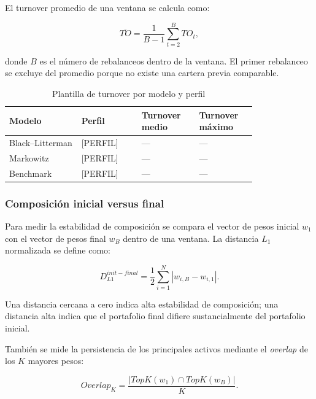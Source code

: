 \documentclass[11pt]{article}
\begin{document}
El turnover promedio de una ventana se calcula como:

\begin{equation}
    \overline{TO}
    =
    \frac{1}{B-1}
    \sum_{t=2}^{B}
    TO_t,
\end{equation}

donde $B$ es el n\'umero de rebalanceos dentro de la ventana. El primer rebalanceo se excluye del promedio porque no existe una cartera previa comparable.

\begin{table}[H]
\centering
\caption{Plantilla de turnover por modelo y perfil}
\begin{tabular}{p{0.24\linewidth} p{0.20\linewidth} p{0.18\linewidth} p{0.18\linewidth}}
\toprule
Modelo & Perfil & Turnover medio & Turnover m\'aximo \\
\midrule
Black--Litterman & [PERFIL] & --- & --- \\
Markowitz & [PERFIL] & --- & --- \\
Benchmark & [PERFIL] & --- & --- \\
\bottomrule
\end{tabular}
\end{table}

\subsubsection{Composici\'on inicial versus final}

Para medir la estabilidad de composici\'on se compara el vector de pesos inicial $w_1$ con el vector de pesos final $w_B$ dentro de una ventana. La distancia $L_1$ normalizada se define como:

\begin{equation}
    D_{L1}^{init-final}
    =
    \frac{1}{2}
    \sum_{i=1}^{N}
    \left|
    w_{i,B} - w_{i,1}
    \right|.
\end{equation}

Una distancia cercana a cero indica alta estabilidad de composici\'on; una distancia alta indica que el portafolio final difiere sustancialmente del portafolio inicial.

Tambi\'en se mide la persistencia de los principales activos mediante el \textit{overlap} de los $K$ mayores pesos:

\begin{equation}
    Overlap_K
    =
    \frac{
    \left|
    TopK(w_1)
    \cap
    TopK(w_B)
    \right|
    }{K}.
\end{equation}
\end{document}
